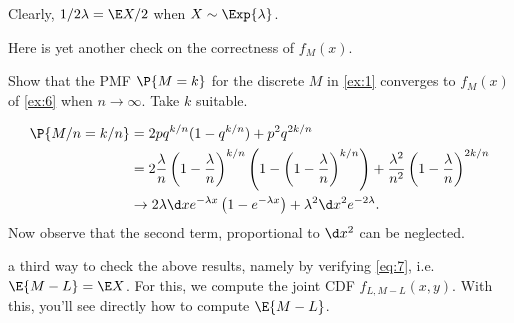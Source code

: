 \documentclass[a4paper]{article}
\begin{document}
Clearly, \(1/2\lambda=\E X/2\) when \(X\sim\Exp{\lambda}\).

Here is yet another check on the correctness of \(f_M(x)\).
\begin{exercise}
Show that  the PMF \(\P{M=k}\) for the discrete \(M\) in \cref{ex:1} converges to \(f_M(x)\) of \cref{ex:6} when \(n\to \infty\). Take \(k\) suitable.
\begin{solution}
  \begin{align*}
\P{M/n=k/n}
&= 2 p q^{k/n}(1-q^{k/n}) + p^2q^{2k/n} \\
&= 2 \frac \lambda n \left(1-\frac \lambda n\right)^{k/n}\left(1-\left(1-\frac \lambda n\right)^{k/n}\right) + \frac{\lambda^2}{n^2}\left(1-\frac \lambda n \right)^{2k/n} \\
&\to 2 \lambda \d x e^{-\lambda x} \left(1 - e^{-\lambda x}\right) + \lambda^{2} \d x^{2}e^{-2\lambda}.
  \end{align*}
Now observe that the second term, proportional to \(\d x^{2}\) can be neglected.
\end{solution}
\end{exercise}


  a third  way to check the above results, namely by verifying  \cref{eq:7}, i.e.  \(\E{M-L} = \E X\).
For this, we  compute the joint CDF \(f_{L, M-L}(x, y)\). With this,  you'll  see directly how to compute \(\E{M-L}\).
\end{document}
